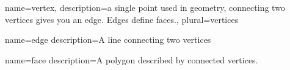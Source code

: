 {
  name=vertex,
  description={a single point used in geometry, connecting two vertices gives you an \gls{edge}. \gls{Edges} define \gls{faces}.},
  plural=vertices
}

{
  name=edge
  description={A line connecting two \gls{vertices}}
}

{
  name=face
  description={A polygon described by connected \gls{vertices}.}
}
